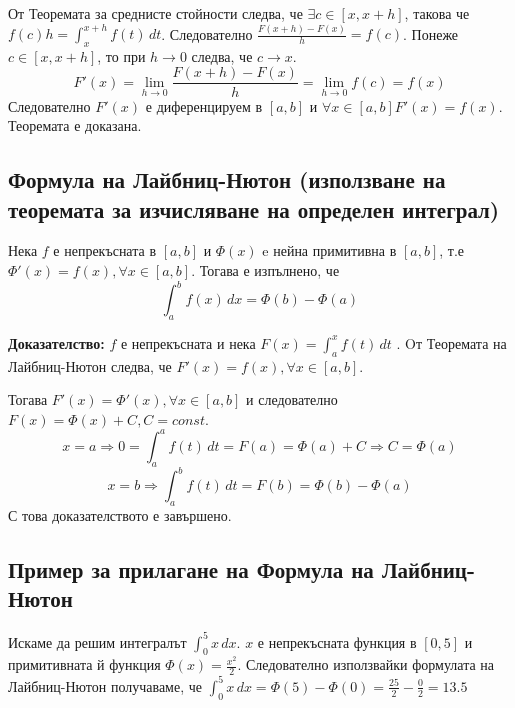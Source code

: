 \documentclass[fleqn,12pt]{article}
\begin{document}
От Теоремата за среднисте стойности следва, че $\exists c \in [x,x+h]$, такова че $f(c)h = \int_{x}^{x+h} f(t)\,dt$.
Следователно $\frac{F(x+h)-F(x)}{h} = f(c)$. Понеже $c \in [x,x+h]$, то при $h \rightarrow 0$ следва, че $c \rightarrow x$.
\[ F'(x) = \lim_{h \rightarrow 0} \frac{F(x+h)-F(x)}{h} = \lim_{h \rightarrow 0} f(c) = f(x) \] 
Следователно $F'(x)$ е диференцируем в $[a,b]$ и $\forall x \in [a,b] F'(x)=f(x)$.
Теоремата е доказана.

\subsection{Формула на Лайбниц-Нютон (използване на теоремата за изчисляване на определен интеграл)}
Нека $f$ е непрекъсната в $[a,b]$ и $\Phi(x)$ e нейна примитивна в $[a,b]$, т.е $\Phi'(x)=f(x), \forall x \in [a,b]$. 
Тогава е изпълнено, че
\[\int_{a}^{b} f(x)\,dx = \Phi(b) - \Phi(a) \]

\textbf{Доказателство: } $f$ е непрекъсната и нека $F(x)=\int_{a}^{x} f(t)\,dt$ . Oт Теоремата на Лайбниц-Нютон следва, че $F'(x)=f(x), \forall x \in [a,b]$.

Тогава $F'(x)=\Phi'(x), \forall x \in [a,b]$ и следователно $F(x) = \Phi(x) + C, C = const$.
\[ x = a \Rightarrow 0 = \int_{a}^{a} f(t)\,dt = F(a) = \Phi(a) + C \Rightarrow C = \Phi(a) \]
\[ x = b \Rightarrow \int_{a}^{b} f(t)\,dt = F(b) = \Phi(b) - \Phi(a) \] 
С това доказателството е завършено.

\subsection{Пример за прилагане на Формула на Лайбниц-Нютон}
Искаме да решим интегралът $\int_{0}^{5} x\,dx$. $x$ е непрекъсната функция в $[0,5]$ и примитивната й функция $\Phi(x)=\frac{x^2}{2}$.
Следователно използвайки формулата на Лайбниц-Нютон получаваме, че $\int_{0}^{5} x\,dx = \Phi(5) - \Phi(0) = \frac{25}{2} - \frac{0}{2} = 13.5$
\end{document}
